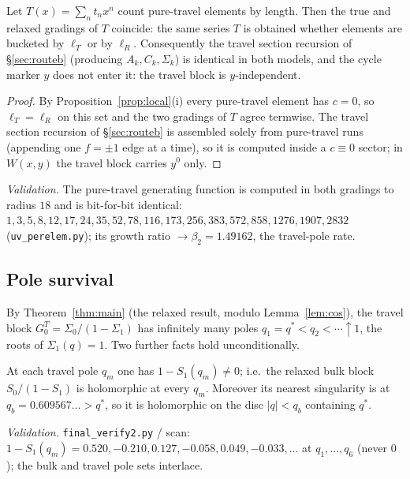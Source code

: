 \begin{proposition}\label{prop:travelinv}
Let $T(x)=\sum_n t_n x^n$ count pure-travel elements by length.  Then the true and
relaxed gradings of $T$ coincide: the same series $T$ is obtained whether elements
are bucketed by $\ell_T$ or by $\ell_R$.  Consequently the travel section recursion
of \S\ref{sec:routeb} \textup(producing $A_k,C_k,\Sigma_k$\textup) is identical in
both models, and the cycle marker $y$ does not enter it: the travel block is
$y$-independent.
\end{proposition}

\begin{proof}
By Proposition~\ref{prop:local}(i) every pure-travel element has $c=0$, so
$\ell_T=\ell_R$ on this set and the two gradings of $T$ agree termwise.  The travel
section recursion of \S\ref{sec:routeb} is assembled solely from pure-travel runs
(appending one $f=\pm1$ edge at a time), so it is computed inside a $c\equiv0$
sector; in $W(x,y)$ the travel block carries $y^0$ only.
\end{proof}

\noindent\emph{Validation.} The pure-travel generating function is computed in both
gradings to radius $18$ and is bit-for-bit identical:
$1,3,5,8,12,17,24,35,52,78,116,173,256,383,572,858,1276,1907,2832$
(\texttt{uv\_perelem.py}); its growth ratio $\to\beta_2=1.49162$, the travel-pole
rate.

\subsection{Pole survival}

By Theorem~\ref{thm:main} (the relaxed result, modulo Lemma~\ref{lem:cos}), the
travel block $G^T_0=\Sigma_0/(1-\Sigma_1)$ has infinitely many poles
$q_1=q^\ast<q_2<\cdots\uparrow1$, the roots of $\Sigma_1(q)=1$.  Two further facts
hold unconditionally.

\begin{lemma}\label{lem:missing}
At each travel pole $q_m$ one has $1-S_1(q_m)\ne0$; i.e.\ the relaxed bulk block
$S_0/(1-S_1)$ is holomorphic at every $q_m$.  Moreover its nearest singularity is at
$q_b=0.609567\ldots>q^\ast$, so it is holomorphic on the disc $|q|<q_b$ containing
$q^\ast$.
\end{lemma}

\noindent\emph{Validation.} \texttt{final\_verify2.py} / scan: $1-S_1(q_m)=
0.520,-0.210,0.127,-0.058,0.049,-0.033,\dots$ at $q_1,\dots,q_6$ (never $0$); the
bulk and travel pole sets interlace.

